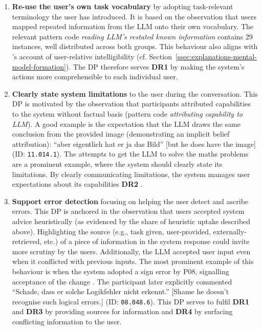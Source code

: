 \begin{enumerate}[label=\textbf{DP-\Alph*}, leftmargin=*]
    \item \textbf{Re-use the user's own task vocabulary} by adopting task-relevant terminology the user has introduced. It is based on the observation that users mapped repeated information from the \ac{LLM} onto their own vocabulary. The relevant pattern code \textit{reading LLM's restated known information} contains 29 instances, well distributed across both groups. This behaviour also aligns with \textcite{Shin2021}'s account of user-relative intelligibility (cf. Section~\ref{ssec:explanations-mental-model-formation}). The \ac{DP} therefore serves \textbf{DR1} by making the system's actions more comprehensible to each individual user.

    \item \textbf{Clearly state system limitations} to the user during the conversation. This \ac{DP} is motivated by the observation that participants attributed capabilities to the system without factual basis (pattern code \textit{attributing capability to LLM}). A good example is the expectation that the \ac{LLM} draws the same conclusion from the provided image (demonstrating an implicit belief attribution): \enquote{aber eigentlich hat er ja das Bild} [but he does have the image] (ID: \texttt{11.014.1}). The attempts to get the \ac{LLM} to solve the maths problems are a prominent example, where the system should clearly state its limitations. By clearly communicating limitations, the system manages user expectations about its capabilities \textbf{DR2} \parencite[cf.][]{Amershi2019}.

    \item \textbf{Support error detection} focusing on helping the user detect and ascribe errors. This \ac{DP} is anchored in the observation that users accepted system advice heuristically (as evidenced by the share of heuristic uptake described above). Highlighting the source (e.g., task given, user-provided, externally-retrieved, etc.) of a piece of information in the system response could invite more scrutiny by the users. Additionally, the \ac{LLM} accepted user input even when it conflicted with previous inputs. The most prominent example of this behaviour is when the system adopted a sign error by P08, signalling acceptance of the change \parencite{Clark1989}. The participant later explicitly commented \enquote{Schade, dass er solche Logikfehler nicht erkennt.} [Shame he doesn't recognise such logical errors.] (ID: \texttt{08.048.6}). This \ac{DP} serves to fulfil \textbf{DR1} and \textbf{DR3} by providing sources for information \parencite[cf.][]{Steyvers2025} and \textbf{DR4} by surfacing conflicting information to the user.


\end{enumerate}
